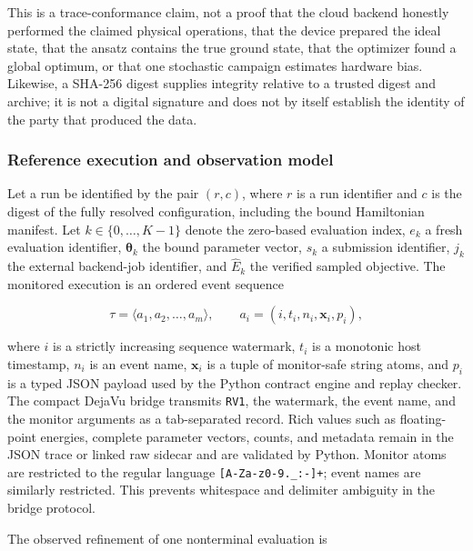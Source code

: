 This is a trace-conformance claim, not a proof that the cloud backend honestly
performed the claimed physical operations, that the device prepared the ideal
state, that the ansatz contains the true ground state, that the optimizer found
a global optimum, or that one stochastic campaign estimates hardware bias.
Likewise, a SHA-256 digest supplies integrity relative to a trusted digest and
archive; it is not a digital signature and does not by itself establish the
identity of the party that produced the data.

\subsubsection{Reference execution and observation model}

Let a run be identified by the pair $(r,c)$, where $r$ is a run identifier and
$c$ is the digest of the fully resolved configuration, including the bound
Hamiltonian manifest.  Let $k\in\{0,\ldots,K-1\}$ denote the zero-based
evaluation index, $e_k$ a fresh evaluation identifier, $\boldsymbol{\theta}_k$
the bound parameter vector, $s_k$ a submission identifier, $j_k$ the external
backend-job identifier, and $\widehat{E}_k$ the verified sampled objective.
The monitored execution is an ordered event sequence

\begin{equation}
  \tau = \langle a_1,a_2,\ldots,a_m\rangle,
  \qquad
  a_i=(i,t_i,n_i,\mathbf{x}_i,p_i),
  \label{eq:rv-trace}
\end{equation}

where $i$ is a strictly increasing sequence watermark, $t_i$ is a monotonic
host timestamp, $n_i$ is an event name, $\mathbf{x}_i$ is a tuple of
monitor-safe string atoms, and $p_i$ is a typed JSON payload used by the Python
contract engine and replay checker.  The compact DejaVu bridge transmits
\texttt{RV1}, the watermark, the event name, and the monitor arguments as a
tab-separated record.  Rich values such as floating-point energies, complete
parameter vectors, counts, and metadata remain in the JSON trace or linked raw
sidecar and are validated by Python.  Monitor atoms are restricted to the
regular language \texttt{[A-Za-z0-9.\_:-]+}; event names are similarly
restricted.  This prevents whitespace and delimiter ambiguity in the bridge
protocol.

The observed refinement of one nonterminal evaluation is

